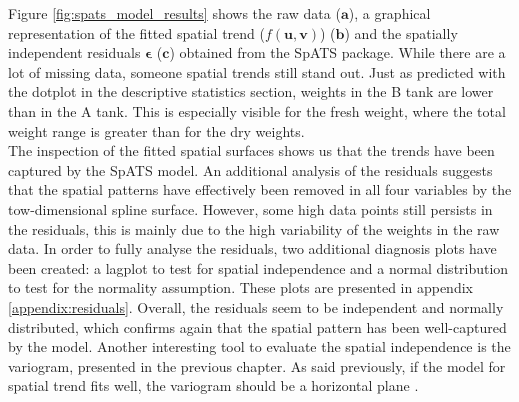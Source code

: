 Figure \ref{fig:spats_model_results} shows the raw data ($\mathbf{a}$), a graphical representation of the fitted spatial trend ($f(\boldsymbol{u}, \boldsymbol{v})$) ($\mathbf{b}$) and the spatially independent residuals $\boldsymbol{\epsilon}$ ($\mathbf{c}$) obtained from the SpATS package. While there are a lot of missing data, someone spatial trends still stand out. Just as predicted with the dotplot in the descriptive statistics section, weights in the B tank are lower than in the A tank. This is especially visible for the fresh weight, where the total weight range is greater than for the dry weights.\\

The inspection of the fitted spatial surfaces shows us that the trends have been captured by the SpATS model. An additional analysis of the residuals suggests that the spatial patterns have effectively been removed in all four variables by the tow-dimensional spline surface. However, some high data points still persists in the residuals, this is mainly due to the high variability of the weights in the raw data. In order to fully analyse the residuals, two additional diagnosis plots have been created: a lagplot to test for spatial independence and a normal distribution to test for the normality assumption. These plots are presented in appendix \ref{appendix:residuals}. Overall, the residuals seem to be independent and normally distributed, which confirms again that the spatial pattern has been well-captured by the model. Another interesting tool to evaluate the spatial independence is the variogram, presented in the previous chapter. 
As said previously, if the model for spatial trend fits well, the variogram should be a horizontal plane \parencite{piepho_linear_2010}.\\

